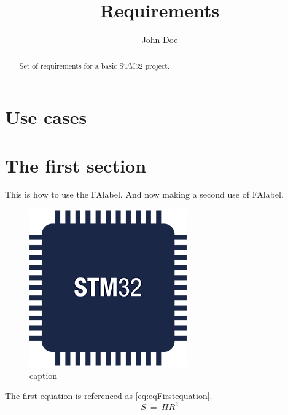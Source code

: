 \documentclass[a4paper,10pt]{article}
\title{Requirements}
\author{John Doe}
\begin{document}
\maketitle
\begin{abstract}
Set of requirements for a basic STM32 project.
\end{abstract}
\printnomenclature
\printglossaries



\section{Use cases}


\section{The first section}
This is how to use the \gls{FAlabel}. And now making a second use of \gls{FAlabel}.
\cite{fooAuthor}

\begin{figure}[ht]
	\centering
	\includegraphics[width=0.75 \textwidth]{../resources/project_logo.png}
	\caption{caption}
	\label{reference}
\end{figure}

The first equation is referenced as \ref{eq:eqFirstequation}.
\begin{equation}
S~=~\Pi R^2
\label{eq:eqFirstequation}
\end{equation}

\printbibliography
\end{document}
